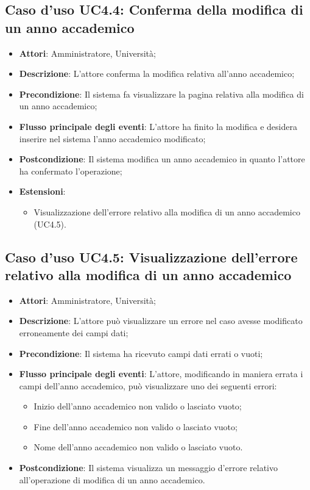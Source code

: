 \subsection{Caso d'uso \texorpdfstring{UC4.4}{UC4.4}: Conferma della modifica di un anno accademico}
\begin{itemize}
	\item \textbf{Attori}: Amministratore, Università;
	\item \textbf{Descrizione}: L'attore conferma la modifica relativa all'anno accademico;
	\item \textbf{Precondizione}: Il sistema fa visualizzare la pagina relativa alla modifica di un anno accademico;
	\item \textbf{Flusso principale degli eventi}: L'attore ha finito la modifica e desidera inserire nel sistema l'anno accademico modificato;
	\item \textbf{Postcondizione}: Il sistema modifica un anno accademico in quanto l'attore ha confermato l'operazione;
	\item \textbf{Estensioni}:
	\begin{itemize}
		\item Visualizzazione dell'errore relativo alla modifica di un anno accademico (UC4.5).
	\end{itemize}
\end{itemize}
\subsection{Caso d'uso \texorpdfstring{UC4.5}{UC4.5}: Visualizzazione dell'errore relativo alla modifica di un anno accademico}
\begin{itemize}
	\item \textbf{Attori}: Amministratore, Università;
	\item \textbf{Descrizione}: L'attore può visualizzare un errore nel caso avesse modificato erroneamente dei campi dati;
	\item \textbf{Precondizione}: Il sistema ha ricevuto campi dati errati o vuoti;
	\item \textbf{Flusso principale degli eventi}: L'attore, modificando in maniera errata i campi dell'anno accademico, può visualizzare uno dei seguenti errori: 
	\begin{itemize}
		\item Inizio dell'anno accademico non valido o lasciato vuoto; 
		\item Fine dell'anno accademico non valido o lasciato vuoto; 
		\item Nome dell'anno accademico non valido o lasciato vuoto. 
	\end{itemize}
	\item \textbf{Postcondizione}: Il sistema visualizza un messaggio d'errore relativo all'operazione di modifica di un anno accademico.
\end{itemize}
